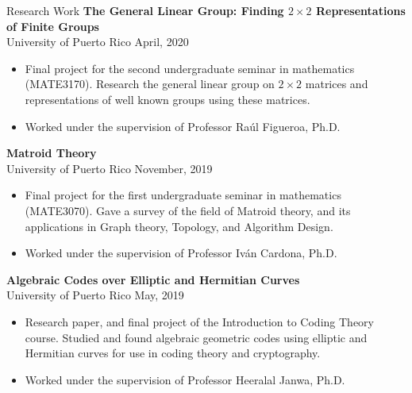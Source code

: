\documentclass{resume} %
\begin{document}
\begin{rSection}{Research Work}
    \textbf{The General Linear Group: Finding $2 \times 2$
    Representations of Finite Groups} \\
    University of Puerto Rico \hfill{April, 2020}
    \begin{itemize}
        \item Final project for the second undergraduate seminar in mathematics
            (MATE3170). Research the general linear group on $2 \times 2$
            matrices and representations of well known groups using these
            matrices.

        \item Worked under the supervision of Professor Ra\'ul Figueroa, Ph.D.
    \end{itemize}

    \textbf{Matroid Theory}  \\
    University of Puerto Rico \hfill{November, 2019}
    \begin{itemize}
        \item Final project for the first undergraduate seminar in mathematics
            (MATE3070). Gave a survey of the field of Matroid theory, and its
            applications in Graph theory, Topology, and Algorithm Design.

        \item Worked under the supervision of Professor Iv\'an Cardona, Ph.D.
    \end{itemize}

    \textbf{Algebraic Codes over Elliptic and Hermitian
    Curves} \\
    University of Puerto Rico \hfill{May, 2019}
    \begin{itemize}
        \item Research paper, and final project of the Introduction to Coding
            Theory course. Studied and found algebraic geometric codes using
            elliptic and Hermitian curves for use in coding theory and
            cryptography.

        \item Worked under the supervision of Professor Heeralal Janwa, Ph.D.
    \end{itemize}
\end{rSection}
\end{document}
